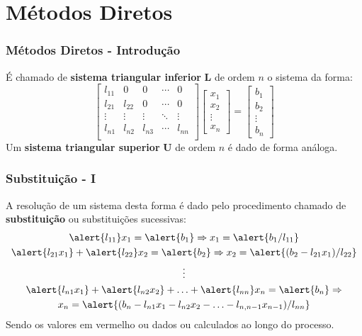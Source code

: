 \documentclass{beamer}
\theoremstyle{mystyle}
\begin{document}
\section{Métodos Diretos}

\begin{frame}
	\frametitle{Métodos Diretos - Introdução}
	É chamado de \textbf{sistema triangular inferior} \textbf{L} de ordem $ n $ o sistema da forma:
	\begin{equation*}
		\left[
		\begin{array}{ccccc}
			l_{11} &   0    &    0   & \cdots & 0 \\
			l_{21} & l_{22} &    0   & \cdots & 0 \\
			\vdots & \vdots & \vdots & \ddots & \vdots \\
			l_{n1} & l_{n2} & l_{n3} & \cdots & l_{nn}\\
		\end{array}
		\right] 
		\begin{bmatrix} x_{1} \\ x_{2} \\ \vdots \\ x_{n} \end{bmatrix}
		=
		\begin{bmatrix} b_{1} \\ b_{2} \\ \vdots \\ b_{n} \end{bmatrix}
	\end{equation*}
	\pause
	Um \textbf{sistema triangular superior} \textbf{U} de ordem $ n $ é dado de forma análoga.
\end{frame}

\begin{frame}
	\frametitle{Substituição - I}
	A resolução de um sistema desta forma é dado pelo procedimento chamado de \textbf{substituição} ou substituições sucessivas:
	\begin{gather*}
		\alert{l_{11}}x_{1} = \alert{b_{1}} \Rightarrow x_{1} = \alert{b_{1}/l_{11}}\\
		\alert{l_{21}x_{1}} + \alert{l_{22}}x_{2} = \alert{b_{2}} \Rightarrow x_{2} = \alert{(b_{2} - l_{21}x_{1})/l_{22}}\\
		\vdots\\
		\alert{l_{n1}x_{1}} + \alert{l_{n2}x_{2}} + \ldots + \alert{l_{nn}}x_{n} = \alert{b_{n}} \Rightarrow\\
		x_{n} = \alert{(b_{n} - l_{n1}x_{1} - l_{n2}x_{2} - \ldots - l_{n,n-1}x_{n-1})/l_{nn}}
	\end{gather*}
	Sendo os valores em vermelho ou dados ou calculados ao longo do processo.
\end{frame}
\end{document}
